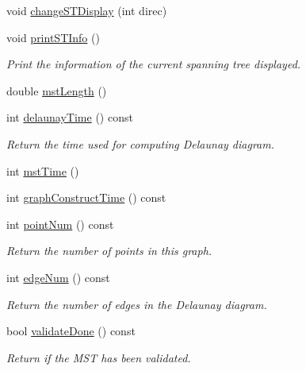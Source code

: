 \begin{DoxyCompactItemize}
void \hyperlink{classcmst_1_1_graph2_d_abb6cf2245d6ac93f5553e28f8723fce5}{changeSTDisplay} (int direc)
\item 
void \hyperlink{classcmst_1_1_graph2_d_a547a65e56068434928777eb7b4e59510}{printSTInfo} ()
\begin{DoxyCompactList}\small\item\em Print the information of the current spanning tree displayed. \end{DoxyCompactList}\item 
double \hyperlink{classcmst_1_1_graph2_d_aea22c23fdbb3b9e91671562cb19730ed}{mstLength} ()
\item 
int \hyperlink{classcmst_1_1_graph2_d_a93a1d4d5d2dd08796e37bcba6de79341}{delaunayTime} () const 
\begin{DoxyCompactList}\small\item\em Return the time used for computing Delaunay diagram. \end{DoxyCompactList}\item 
int \hyperlink{classcmst_1_1_graph2_d_a3b596946f310f7024036d2c6a18985a3}{mstTime} ()
\item 
int \hyperlink{classcmst_1_1_graph2_d_ad4756aa3f617493bd8b3f6ecfe099449}{graphConstructTime} () const 
\item 
int \hyperlink{classcmst_1_1_graph2_d_a0b18b38d5813b2fdbe8f5a8d6f92575d}{pointNum} () const 
\begin{DoxyCompactList}\small\item\em Return the number of points in this graph. \end{DoxyCompactList}\item 
int \hyperlink{classcmst_1_1_graph2_d_ae2474e4dd9964cd18fc9926a296c82fd}{edgeNum} () const 
\begin{DoxyCompactList}\small\item\em Return the number of edges in the Delaunay diagram. \end{DoxyCompactList}\item 
bool \hyperlink{classcmst_1_1_graph2_d_ab7fbcf59b9ef4e9cc10015fd610cb4fc}{validateDone} () const 
\begin{DoxyCompactList}\small\item\em Return if the MST has been validated. \end{DoxyCompactList}\end{DoxyCompactItemize}
